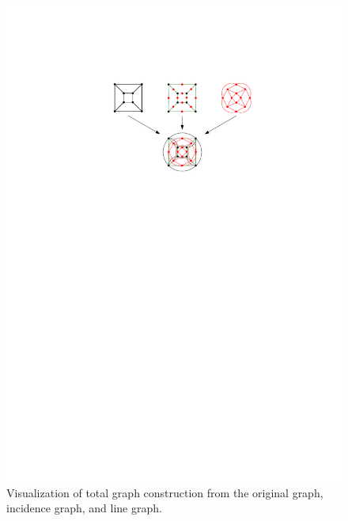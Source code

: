 \begin{figure}[H]
    \centering
    \includegraphics[width=1\textwidth]{../Resources/Figs/cubical_total_graph.pdf}
    \caption{Visualization of total graph construction from the original graph, incidence graph, and line graph.}
    \label{fig:cubical_total_graph}
\end{figure}


